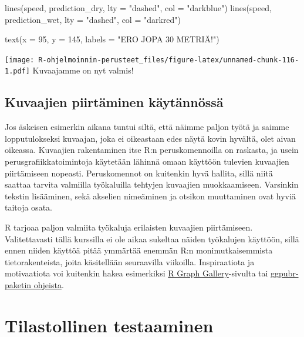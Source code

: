 \documentclass[
]{book}
\newenvironment{Shaded}{\begin{snugshade}}{\end{snugshade}}
\newcommand{\AttributeTok}[1]{\textcolor[rgb]{0.77,0.63,0.00}{#1}}
\newcommand{\DecValTok}[1]{\textcolor[rgb]{0.00,0.00,0.81}{#1}}
\newcommand{\FunctionTok}[1]{\textcolor[rgb]{0.00,0.00,0.00}{#1}}
\newcommand{\NormalTok}[1]{#1}
\newcommand{\StringTok}[1]{\textcolor[rgb]{0.31,0.60,0.02}{#1}}
\begin{document}
\begin{Shaded}
\begin{Highlighting}[]
\FunctionTok{lines}\NormalTok{(speed, prediction\_dry, }\AttributeTok{lty =} \StringTok{"dashed"}\NormalTok{, }\AttributeTok{col =} \StringTok{"darkblue"}\NormalTok{)}
\FunctionTok{lines}\NormalTok{(speed, prediction\_wet, }\AttributeTok{lty =} \StringTok{"dashed"}\NormalTok{, }\AttributeTok{col =} \StringTok{"darkred"}\NormalTok{)}

\FunctionTok{text}\NormalTok{(}\AttributeTok{x =} \DecValTok{95}\NormalTok{, }\AttributeTok{y =} \DecValTok{145}\NormalTok{, }\AttributeTok{labels =} \StringTok{"ERO JOPA 30 METRIÄ!"}\NormalTok{) }
\end{Highlighting}
\end{Shaded}

\texttt{[image: R-ohjelmoinnin-perusteet\_files/figure-latex/unnamed-chunk-116-1.pdf]}
Kuvaajamme on nyt valmis!

\hypertarget{kuvaajien-piirtuxe4minen-kuxe4ytuxe4nnuxf6ssuxe4}{%
\section{Kuvaajien piirtäminen käytännössä}\label{kuvaajien-piirtuxe4minen-kuxe4ytuxe4nnuxf6ssuxe4}}

Jos äskeisen esimerkin aikana tuntui siltä, että näimme paljon työtä ja saimme lopputulokseksi kuvaajan, joka ei oikeastaan edes näytä kovin hyvältä, olet aivan oikeassa. Kuvaajien rakentaminen itse R:n peruskomennoilla on raskasta, ja usein perusgrafiikkatoimintoja käytetään lähinnä omaan käyttöön tulevien kuvaajien piirtämiseen nopeasti. Peruskomennot on kuitenkin hyvä hallita, sillä niitä saattaa tarvita valmiilla työkaluilla tehtyjen kuvaajien muokkaamiseen. Varsinkin tekstin lisääminen, sekä akselien nimeäminen ja otsikon muuttaminen ovat hyviä taitoja osata.

R tarjoaa paljon valmiita työkaluja erilaisten kuvaajien piirtämiseen. Valitettavasti tällä kurssilla ei ole aikaa sukeltaa näiden työkalujen käyttöön, sillä ennen niiden käyttöä pitää ymmärtää enemmän R:n monimutkaisemmista tietorakenteista, joita käsitellään seuraavilla viikoilla. Inspiraatiota ja motivaatiota voi kuitenkin hakea esimerkiksi \href{https://www.r-graph-gallery.com/index.html}{R Graph Gallery}-sivulta tai \href{https://rpkgs.datanovia.com/ggpubr/index.html}{ggpubr-paketin ohjeista}.

\hypertarget{tests}{%
\chapter{Tilastollinen testaaminen}\label{tests}}
\end{document}
